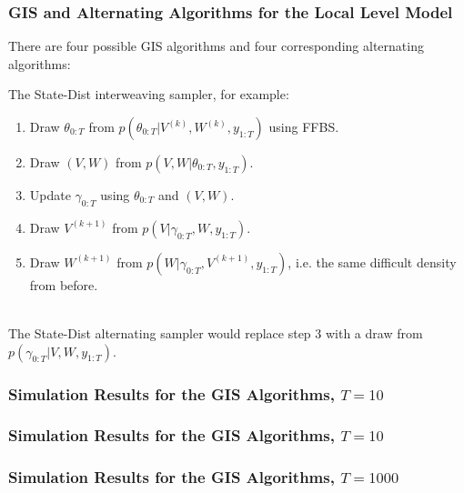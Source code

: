 \documentclass[xcolor=dvipsnames]{beamer}
\begin{document}
\begin{frame}
  \frametitle{GIS and Alternating Algorithms for the Local Level Model}
There are four possible GIS algorithms and four corresponding alternating algorithms:
\begin{table}[h]
  \centering
  \label{table:sams}
\end{table}
\pause

The State-Dist interweaving sampler, for example:
\begin{enumerate}
  \item Draw $\theta_{0:T}$ from $p(\theta_{0:T}|V^{(k)},W^{(k)},y_{1:T})$ using FFBS.
  \item Draw $(V,W)$ from $p(V,W|\theta_{0:T}, y_{1:T})$.
  \item Update $\gamma_{0:T}$ using $\theta_{0:T}$ and $(V,W)$.
  \item Draw $V^{(k+1)}$ from $p(V|\gamma_{0:T}, W, y_{1:T})$.
  \item Draw $W^{(k+1)}$ from $p(W|\gamma_{0:T}, V^{(k+1)}, y_{1:T})$, i.e. the same difficult density from before.\\~\\
\end{enumerate}
\pause
  The State-Dist alternating sampler would replace step 3 with a draw from $p(\gamma_{0:T}|V,W,y_{1:T})$.
\end{frame}

\begin{frame}
    \frametitle{Simulation Results for the GIS Algorithms, $T=10$}
    
\end{frame}

\begin{frame}
    \frametitle{Simulation Results for the GIS Algorithms, $T=10$}
    
\end{frame}

\begin{frame}
    \frametitle{Simulation Results for the GIS Algorithms, $T=1000$}
    
\end{frame}
\end{document}
